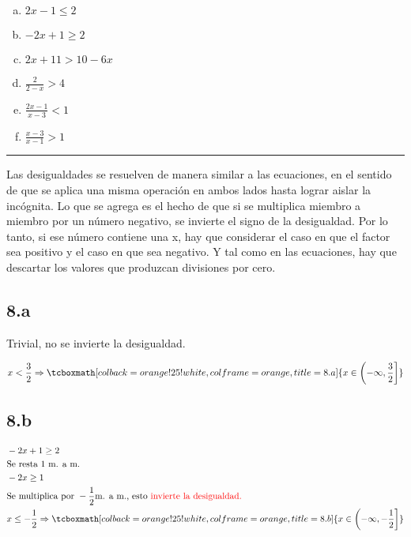 \documentclass{article}
\begin{document}
\begin{enumerate}[(a)]
\bfseries

\item $ 2x-1 \leq 2 $

\item $ -2x+1 \geq 2 $

\item $ 2x + 11 > 10-6x $

\item $ \frac{2}{2-x} > 4 $

\item $ \frac{2x-1}{x-3} < 1 $

\item $ \frac{x-3}{x-1} > 1 $

\end{enumerate}
\hrule
\vspace{1em}
Las desigualdades se resuelven de manera similar a las ecuaciones, en el sentido de que se aplica una misma operación en ambos lados hasta lograr aislar la incógnita. Lo que se agrega es el hecho de que si se multiplica miembro a miembro por un número negativo, se invierte el signo de la desigualdad. Por lo tanto, si ese número contiene una x, hay que considerar el caso en que el factor sea positivo y el caso en que sea negativo. Y tal como en las ecuaciones, hay que descartar los valores que produzcan divisiones por cero.

\subsection*{8.a}
\label{subsec:8.a}

Trivial, no se invierte la desigualdad.

\begin{equation}
x < \frac{3}{2} \Rightarrow \tcboxmath[colback=orange!25!white,colframe=orange, title=8.a] { x \in \left(-\infty, \frac{3}{2}\right] }
\end{equation}

\subsection*{8.b}
\label{subsec:8.b}

\begin{subequations}
\begin{align}
& -2x+1 \geq 2 \\
& \text{Se resta 1 m. a m.} \\
& -2x \geq 1 \\
& \text{Se multiplica por } -\frac{1}{2} \text{m. a m., esto \color{red}{invierte} la desigualdad.} \\
& x \leq -\frac{1}{2} \Rightarrow \tcboxmath[colback=orange!25!white,colframe=orange, title=8.b] { x \in \left( -\infty, -\frac{1}{2} \right] }
\end{align}
\end{subequations}
\end{document}
